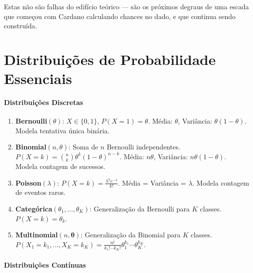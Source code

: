 \documentclass{tufte-handout}
\begin{document}
Estas não são falhas do edifício teórico --- são os próximos degraus de uma escada
que começou com Cardano calculando chances no dado, e que continua sendo construída.


\appendix

\section{Distribuições de Probabilidade Essenciais}

\paragraph{Distribuições Discretas}

\begin{enumerate}
    \item \textbf{Bernoulli}$(\theta)$: $X \in \{0, 1\}$, $P(X=1) = \theta$.
    Média: $\theta$, Variância: $\theta(1-\theta)$. Modela tentativa única binária.

    \item \textbf{Binomial}$(n, \theta)$: Soma de $n$ Bernoulli independentes.
    $P(X = k) = \binom{n}{k} \theta^k (1-\theta)^{n-k}$. Média: $n\theta$, Variância:
    $n\theta(1-\theta)$. Modela contagem de sucessos.

    \item \textbf{Poisson}$(\lambda)$: $P(X = k) = \frac{\lambda^k e^{-\lambda}}{k!}$.
    Média = Variância = $\lambda$. Modela contagem de eventos raros.

    \item \textbf{Categórica}$(\theta_1, \dots, \theta_K)$: Generalização da Bernoulli
    para $K$ classes. $P(X = k) = \theta_k$.

    \item \textbf{Multinomial}$(n, \boldsymbol{\theta})$: Generalização da Binomial
    para $K$ classes. $P(X_1 = k_1, \dots, X_K = k_K) = \frac{n!}{k_1!\cdots k_K!} \theta_1^{k_1} \cdots \theta_K^{k_K}$.
\end{enumerate}

\paragraph{Distribuições Contínuas}
\end{document}
